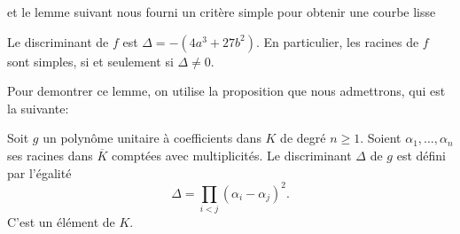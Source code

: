 et le lemme suivant nous fourni un critère simple pour obtenir une courbe lisse

\begin{lemme}
    \label{lem:lemme1}
    Le discriminant de $f$ est $\Delta = -(4a^3 + 27b^2)$. En particulier, les racines de $f$ sont simples, si et seulement si $\Delta \neq 0$.
\end{lemme}

Pour demontrer ce lemme, on utilise la proposition que nous admettrons, qui est la suivante:
\begin{proposition}
    \label{prop:discriminant}
    Soit $g$ un polynôme unitaire à coefficients dans $K$ de degré $n \ge 1$. Soient
    $\alpha_1,\ldots,\alpha_{n}$ ses racines dans $\overline{K}$ comptées avec
    multiplicités. Le discriminant $\Delta$ de $g$ est défini par l'égalité
    \[
    \Delta = \prod_{i<j}^{} \left( \alpha_{i} - \alpha_{j} \right) ^2 
    .\] 
    C'est un élément de $K$.
\end{proposition}

